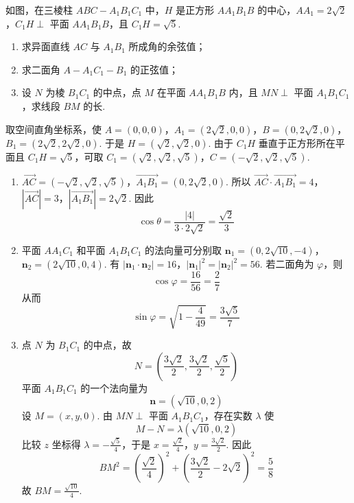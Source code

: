 \begin{problem}
如图，在三棱柱 \(ABC - A_{1}B_{1}C_{1}\) 中，\(H\) 是正方形 \(AA_{1}B_{1}B\) 的中心，\(AA_{1} = 2\sqrt{2}\)，\(C_{1}H \perp\) 平面 \(AA_{1}B_{1}B\)，且 \(C_{1}H = \sqrt{5}\).
\begin{enumerate}
\item 求异面直线 \(AC\) 与 \(A_{1}B_{1}\) 所成角的余弦值；
\item 求二面角 \(A - A_{1}C_{1} - B_{1}\) 的正弦值；
\item 设 \(N\) 为棱 \(B_{1}C_{1}\) 的中点，点 \(M\) 在平面 \(AA_{1}B_{1}B\) 内，且 \(MN \perp\) 平面 \(A_{1}B_{1}C_{1}\)，求线段 \(BM\) 的长.
\end{enumerate}
\begin{solution}
取空间直角坐标系，使
\(A=(0,0,0)\)，\(A_1=(2\sqrt2,0,0)\)，\(B=(0,2\sqrt2,0)\)，\(B_1=(2\sqrt2,2\sqrt2,0)\).
于是 \(H=(\sqrt2,\sqrt2,0)\). 由于 \(C_1H\) 垂直于正方形所在平面且
\(C_1H=\sqrt5\)，可取
\(C_1=(\sqrt2,\sqrt2,\sqrt5)\)，\(C=(-\sqrt2,\sqrt2,\sqrt5)\).

\begin{enumerate}
\item
\(\overrightarrow{AC}=(-\sqrt2,\sqrt2,\sqrt5)\)，\(\overrightarrow{A_1B_1}=(0,2\sqrt2,0)\).
所以
\(\overrightarrow{AC}\cdot\overrightarrow{A_1B_1}=4\)，\(|\overrightarrow{AC}|=3\)，\(|\overrightarrow{A_1B_1}|=2\sqrt2\).
因此
\[
\cos\theta=\frac{|4|}{3\cdot2\sqrt2}
=\frac{\sqrt2}{3}
\]
\item 平面 \(AA_1C_1\) 和平面 \(A_1B_1C_1\) 的法向量可分别取
\(\mathbf n_1=(0,2\sqrt{10},-4)\)，\(\mathbf n_2=(2\sqrt{10},0,4)\).
有
\(|\mathbf n_1\cdot\mathbf n_2|=16\)，\(|\mathbf n_1|^2=|\mathbf n_2|^2=56\).
若二面角为 \(\varphi\)，则
\[
\cos\varphi=\frac{16}{56}=\frac27
\]
从而
\[
\sin\varphi=\sqrt{1-\frac4{49}}=\frac{3\sqrt5}{7}
\]

\item 点 \(N\) 为 \(B_1C_1\) 的中点，故
\[
N=\left(\frac{3\sqrt2}{2},\frac{3\sqrt2}{2},\frac{\sqrt5}{2}\right)
\]
平面 \(A_1B_1C_1\) 的一个法向量为
\[
\mathbf n=(\sqrt{10},0,2)
\]
设 \(M=(x,y,0)\). 由 \(MN\perp\) 平面 \(A_1B_1C_1\)，存在实数 \(\lambda\) 使
\[
M-N=\lambda(\sqrt{10},0,2)
\]
比较 \(z\) 坐标得 \(\lambda=-\frac{\sqrt5}{4}\)，于是
\(x=\frac{\sqrt2}{4}\)，\(y=\frac{3\sqrt2}{2}\).
因此
\[
BM^2=\left(\frac{\sqrt2}{4}\right)^2
+\left(\frac{3\sqrt2}{2}-2\sqrt2\right)^2
=\frac{5}{8}
\]
故 \(BM=\frac{\sqrt{10}}4\).
\end{enumerate}
\end{solution}
\end{problem}


